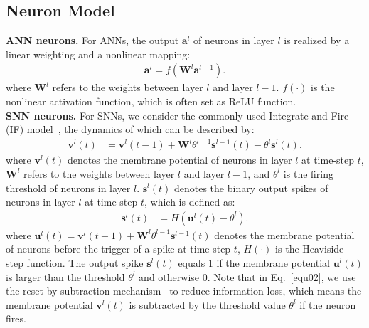 \documentclass[letterpaper]{article} %
\begin{document}
\subsection{Neuron Model}
\textbf{ANN neurons.} For ANNs, the output $\boldsymbol{a}^l$ of neurons in layer $l$ is realized by
a linear weighting and a nonlinear mapping:
\begin{align}
    \boldsymbol{a}^l=f(\boldsymbol{W}^{l}\boldsymbol{a}^{l-1}).
    \label{ann}
\end{align}
where $\boldsymbol{W}^{l}$ refers to the weights between layer $l$ and layer $l-1$. $f(\cdot)$ is the nonlinear activation function, which is often set as ReLU function.\\
\textbf{SNN neurons.} For SNNs, we consider the commonly used Integrate-and-Fire (IF) model~\cite{diehl2015fast,sengupta2019going,han2020rmp,deng2020optimal,bu2022optimal}, the dynamics of which can be described by:
\begin{align}
	\boldsymbol{v}^{l}(t) &= \boldsymbol{v}^{l}(t-1) + \boldsymbol{W}^{l}{\theta}^{l-1} \boldsymbol{s}^{l-1}(t)-{\theta}^{l} \boldsymbol{s}^{l}(t).  \label{equ02}
\end{align}
where $\boldsymbol{v}^{l}(t)$ denotes the membrane potential of neurons in layer $l$ at time-step $t$, $\boldsymbol{W}^{l}$ refers to the weights between layer $l$ and layer $l-1$, and ${\theta}^l$ is the firing threshold of neurons in layer $l$. $\boldsymbol{s}^{l}(t)$ denotes the binary output spikes of neurons in layer $l$ at time-step $t$, which is defined as:
\begin{align}
    \boldsymbol{s}^{l}(t) &= H(\boldsymbol{u}^{l}(t) - {\theta}^{l}). \label{equ03}
\end{align}
where $\boldsymbol{u}^{l}(t)=\boldsymbol{v}^{l}(t-1) + \boldsymbol{W}^{l} {\theta}^{l-1} \boldsymbol{s}^{l-1}(t)$ denotes the membrane potential of neurons before the trigger of a spike at time-step $t$, $H(\cdot)$ is the Heaviside step function. The output spike $\boldsymbol{s}^{l}(t)$
equals 1 if the membrane potential $\boldsymbol{u}^{l}(t)$ is larger than the threshold ${\theta}^l$ and otherwise 0. Note that in Eq.~\eqref{equ02}, we use the reset-by-subtraction mechanism~\cite{Bodo2017Conversion} to reduce information loss, which means the membrane potential $\boldsymbol{v}^l(t)$ is subtracted by the threshold value ${\theta}^l$ if the neuron fires.
\end{document}
